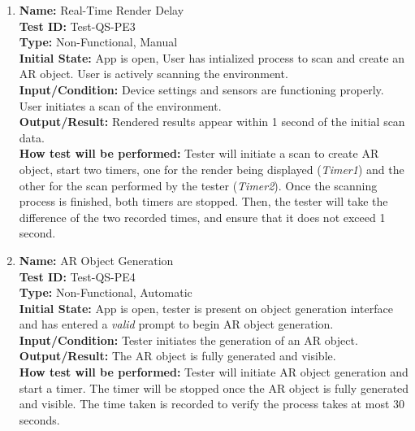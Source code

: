 \documentclass[12pt, titlepage]{article}
\begin{document}
\begin{enumerate}
  \item \textbf{Name:} Real-Time Render Delay \label{itm:Test-QS-PE3} \\
    \textbf{Test ID:} Test-QS-PE3 \\
    \textbf{Type:} Non-Functional, Manual \\
    \textbf{Initial State:} App is open, User has intialized process to scan and create an AR object. User is actively scanning the environment. \\
    \textbf{Input/Condition:} Device settings and sensors are functioning properly. User initiates a scan of the environment. \\
    \textbf{Output/Result:} Rendered results appear within 1 second of the initial scan data. \\
    \textbf{How test will be performed:} Tester will initiate a scan to create AR object, start two timers, one for the render being displayed (\textit{Timer1}) and the other for the scan performed by the tester (\textit{Timer2}). Once the scanning process is finished, both timers are stopped. Then, the tester will take the difference of the two recorded times, and ensure that it does not exceed 1 second. \\

  \item \textbf{Name:} AR Object Generation \label{itm:Test-QS-PE4} \\
    \textbf{Test ID:} Test-QS-PE4 \\
    \textbf{Type:} Non-Functional, Automatic \\
    \textbf{Initial State:} App is open, tester is present on object generation interface and has entered a \textit{valid} prompt to begin AR object generation. \\
    \textbf{Input/Condition:} Tester initiates the generation of an AR object. \\
    \textbf{Output/Result:} The AR object is fully generated and visible. \\
    \textbf{How test will be performed:} Tester will initiate AR object generation and start a timer. The timer will be stopped once the AR object is fully generated and visible. The time taken is recorded to verify the process takes at most 30 seconds. \\


\end{enumerate}
\end{document}
